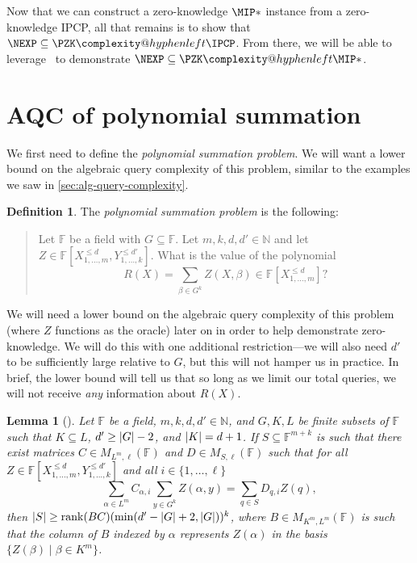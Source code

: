 \documentclass[english,12pt]{reedthesis}
\makeatletter
\theoremstyle{plain}
\newtheorem{lemma}[lemma]{Lemma}
\theoremstyle{definition}
\newtheorem{defn}[defn]{Definition}
\theoremstyle{remark}
\DeclareMathOperator{\rk}{rank}
\DeclarePairedDelimiter{\abs}{\lvert}{\rvert}
\newcommand{\PZKIPCP}{%
  \PZK\complexity@hyphenleft\IPCP
}
\newcommand{\PZKMIP}{%
  \PZK\complexity@hyphenleft\MIP
}
\makeatother
\begin{document}
Now that we can construct a zero-knowledge $\MIP*$ instance from a
zero-knowledge IPCP, all that remains is to show that $\NEXP \subseteq \PZKIPCP$. From
there, we will be able to leverage~\cite[Lemma 9.1]{CFGS22} to demonstrate
$\NEXP \subseteq \PZKMIP*$.

\section{AQC of polynomial summation}\label{sec:aqc-poly-sum}

We first need to define the \emph{polynomial summation problem}. We will want a
lower bound on the algebraic query complexity of this problem, similar to the
examples we saw in \cref{sec:alg-query-complexity}.

\begin{defn}\label{def:poly-sum}
  The \emph{polynomial summation problem} is the following:
  \begin{quote}
    Let $\mathbb{F}$ be a field with $G \subseteq \mathbb{F}$. Let $m, k, d, d' \in \mathbb{N}$ and
    let $Z \in \mathbb{F}[X_{1, \ldots, m}^{\le d}, Y_{1, \ldots, k}^{\le d'}]$.
    What is the value of the polynomial
    \[
      R(X) = \sum_{\beta \in G^{k}}Z(X, \beta) \in \mathbb{F}[X_{1, \ldots, m}^{\le d}]?
    \]
  \end{quote}
\end{defn}

We will need a lower bound on the algebraic query complexity of this problem
(where $Z$ functions as the oracle) later on in order to help demonstrate
zero-knowledge. We will do this with one additional restriction---we will also
need $d'$ to be sufficiently large relative to $G$, but this will not hamper us
in practice. In brief, the lower bound will tell us that so long as we limit
our total queries, we will not receive \emph{any} information about $R(X)$.

\begin{lemma}[{\cite[Lemma 12.1]{CFGS22}}]\label{lem:sum-c-z}
  Let $\mathbb{F}$ be a field, $m, k, d, d' \in \mathbb{N}$, and $G, K, L$ be finite
  subsets of $\mathbb{F}$ such that $K \subseteq L$, $d' \ge \abs{G} - 2$, and
  $\abs{K} = d + 1$. If $S \subseteq \mathbb{F}^{m+k}$ is such that there exist matrices
  $C \in M_{L^{m},\ell}(\mathbb{F})$ and $D \in M_{S, \ell}(\mathbb{F})$ such that for
  all $Z \in \mathbb{F}[X_{1, \ldots, m}^{\le d}, Y_{1, \ldots, k}^{\le d'}]$ and all
  $i \in \{1, \ldots, \ell\}$
  \begin{equation}\label{eqn:polynomial-sum}
    \sum_{\alpha \in L^{m}}C_{\alpha,i}\sum_{y \in G^{k}}Z(\alpha, y) = \sum_{q \in S}D_{q,i}Z(q),
  \end{equation}
  then $\abs{S} \ge \rk(BC)(\min(d' - \abs{G} + 2, \abs{G}))^{k}$, where
  $B \in M_{K^{m}, L^{m}}(\mathbb{F})$ is such that the column of $B$ indexed by
  $\alpha$ represents $Z(\alpha)$ in the basis $\{Z(\beta) \mid \beta \in K^{m}\}$.
\end{lemma}
\end{document}
